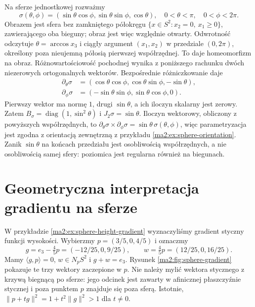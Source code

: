 \begin{przyklad}
\label{ma2:ex:sphere-area-factor}
Na sferze jednostkowej rozważmy
\[
 \sigma(\theta,\phi)=
 (\sin\theta\cos\phi,\sin\theta\sin\phi,\cos\theta),
 \quad 0<\theta<\pi,\quad 0<\phi<2\pi.
\]
Obrazem jest sfera bez zamkniętego półokręgu
$\{x\in S^2:x_2=0,\ x_1\ge0\}$, zawierającego
oba bieguny; obraz jest więc względnie otwarty.
Odwrotność odczytuje $\theta=\arccos x_3$ i ciągły
argument $(x_1,x_2)$ w przedziale $(0,2\pi)$,
określony poza nieujemną półosią pierwszej
współrzędnej. To daje homeomorfizm na obraz.
Różnowartościowość pochodnej wynika z poniższego
rachunku dwóch niezerowych ortogonalnych wektorów.
Bezpośrednie różniczkowanie daje
\[
 \begin{aligned}
 \partial_\theta\sigma&=(\cos\theta\cos\phi,
                  \cos\theta\sin\phi,-\sin\theta),\\
 \partial_\phi\sigma&=(-\sin\theta\sin\phi,
                  \sin\theta\cos\phi,0).
 \end{aligned}
\]
Pierwszy wektor ma normę $1$, drugi $\sin\theta$,
a ich iloczyn skalarny jest zerowy.
Zatem $B_\sigma=\operatorname{diag}(1,\sin^2\theta)$
i $J_2\sigma=\sin\theta$.
Iloczyn wektorowy, obliczony z powyższych
współrzędnych, to
$\partial_\theta\sigma\times\partial_\phi\sigma
=\sin\theta\,\sigma(\theta,\phi)$, więc
parametryzacja jest zgodna z orientacją zewnętrzną
z przykładu \ref{ma2:ex:sphere-orientation}.
Zanik $\sin\theta$ na końcach przedziału
jest osobliwością współrzędnych, a nie osobliwością
samej sfery: poziomica jest regularna również
na biegunach.
\end{przyklad}

\section{Geometryczna interpretacja gradientu na sferze}

W przykładzie \ref{ma2:ex:sphere-height-gradient}
wyznaczyliśmy gradient styczny funkcji wysokości.
Wybierzmy $p=(3/5,0,4/5)$ i oznaczmy
\[
 g=e_3-\tfrac45p=(-12/25,0,9/25),\qquad
 w=\tfrac45p=(12/25,0,16/25).
\]
Mamy $\langle g,p\rangle=0$, $w\in N_pS^2$
i $g+w=e_3$. Rysunek \ref{ma2:fig:sphere-gradient}
pokazuje te trzy wektory zaczepione w $p$.
Nie należy mylić wektora stycznego z krzywą
biegnącą po sferze: jego odcinek jest zawarty
w afinicznej płaszczyźnie stycznej i poza punktem
$p$ znajduje się poza sferą. Istotnie,
$\|p+tg\|^2=1+t^2\|g\|^2>1$ dla $t\ne0$.

